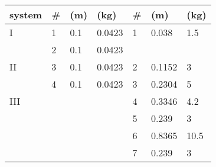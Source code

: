 {\begin{table}[t!]
\begin{tabular}{l|lll|lll}
			\textbf{system}& \# & (m)& (kg)& \# & (m)& (kg)\\ [2 mm]
			\hline
			I & 1 & 0.1 & 0.0423 & 1 & 0.038 & 1.5 \\
			  & 2 & 0.1 & 0.0423 &   &       &      \\ 
			\hline
			II& 3 & 0.1 & 0.0423 & 2 & 0.1152 & 3  \\ 
			  & 4 &  0.1  & 0.0423 & 3 & 0.2304 & 5  \\ 
			\hline
			III & & & & 4 & 0.3346 & 4.2\\ 
			&  &  & & 5 & 0.239 & 3 \\
			& & & & 6 & 0.8365 & 10.5\\ 
			& & & & 7 & 0.239 & 3 \\ 
			\hline
		\end{tabular}
\end{table}

}
